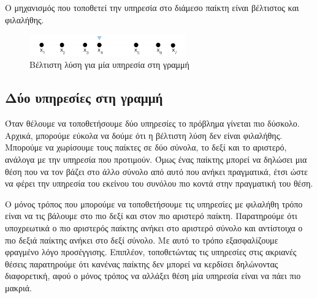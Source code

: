 \begin{theoremgr}
Ο μηχανισμός που τοποθετεί την υπηρεσία στο διάμεσο παίκτη είναι βέλτιστος και φιλαλήθης.
 \end{theoremgr}

\begin{figure}[ht]
    \centering
    \includegraphics[width=0.6\textwidth]{Images/Median.png}
    \caption{Βέλτιστη λύση για μία υπηρεσία στη γραμμή}
    \label{fig:med}
\end{figure}

 
\subsection*{Δύο υπηρεσίες στη γραμμή}

Όταν θέλουμε να τοποθετήσουμε δύο υπηρεσίες το πρόβλημα γίνεται πιο δύσκολο. Αρχικά, μπορούμε εύκολα να δούμε ότι η βέλτιστη λύση δεν είναι φιλαλήθης. Μπορούμε να χωρίσουμε τους παίκτες σε δύο σύνολα, το δεξί και το αριστερό, ανάλογα με την υπηρεσία που προτιμούν. Όμως ένας παίκτης μπορεί να δηλώσει μια θέση που να τον βάζει στο άλλο σύνολο από αυτό που ανήκει πραγματικά, έτσι ώστε να φέρει την υπηρεσία του εκείνου του συνόλου πιο κοντά στην πραγματική του θέση. 


 
Ο μόνος τρόπος που μπορούμε να τοποθετήσουμε τις υπηρεσίες με φιλαλήθη τρόπο είναι να τις βάλουμε στο πιο δεξί και στον πιο αριστερό παίκτη. Παρατηρούμε ότι υποχρεωτικά ο πιο αριστερός παίκτης ανήκει στο αριστερό σύνολο και αντίστοιχα ο πιο δεξιά παίκτης ανήκει στο δεξί σύνολο. Με αυτό το τρόπο εξασφαλίζουμε φραγμένο λόγο προσέγγισης. Επιπλέον, τοποθετώντας τις υπηρεσίες στις ακριανές θέσεις παρατηρούμε ότι κανένας παίκτης δεν μπορεί να κερδίσει δηλώνοντας διαφορετική, αφού ο μόνος τρόπος να αλλάξει θέση μία υπηρεσία είναι να πάει πιο μακριά. 




